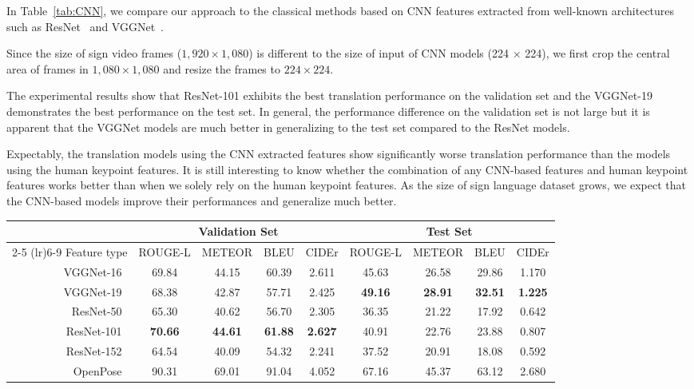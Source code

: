 \documentclass[10pt,twocolumn,letterpaper]{article}
\begin{document}
In Table~\ref{tab:CNN}, we compare our approach to the classical methods 
based on CNN features extracted from well-known architectures such as 
ResNet~\cite{HeZRS16} and VGGNet~\cite{SimonyanZ14a}.

Since the size of sign video frames ($1,920 \times 1,080$) is different to the size of input of CNN models (224 $\times$ 224), we first crop the central area of frames in $1,080 \times 1,080$ and resize the frames to $224 \times 224$.

The experimental results show that ResNet-101 exhibits the best translation performance on the validation set and the VGGNet-19 demonstrates the best performance on the test set. In general, the performance difference on the validation set is not large but it is apparent that the VGGNet models are much better in generalizing to the test set compared to the ResNet models. 

Expectably, the translation models using the CNN extracted features show significantly worse translation performance than the models using the human keypoint features. It is still interesting to know whether the combination of any CNN-based features and human keypoint features works better than when we solely rely on the human keypoint features. As the size of sign language dataset grows, we expect that the CNN-based models improve their performances and generalize much better.
\\

\begin{table*}[ht]
\centering
\begin{tabular}{@{ }rcccccccc@{ }}
\toprule
& \multicolumn{4}{c}{Validation Set} & \multicolumn{4}{c}{Test Set} \\
\cmidrule(lr){2-5} \cmidrule(lr){6-9}
Feature type    &   ROUGE-L & METEOR  & BLEU  & CIDEr &  ROUGE-L & METEOR  & BLEU & CIDEr\\
\midrule
VGGNet-16~\cite{SimonyanZ14a}  &  69.84 & 44.15 & 60.39 & 2.611 & 45.63 & 26.58 & 29.86 & 1.170\\
VGGNet-19~\cite{SimonyanZ14a}  &  68.38 & 42.87 & 57.71 & 2.425 & {\bf 49.16} & {\bf 28.91} & {\bf 32.51} & {\bf 1.225}\\ 
ResNet-50~\cite{HeZRS16}  & 65.30 & 40.62 & 56.70 & 2.305 & 36.35 & 21.22 & 17.92 & 0.642\\ 
ResNet-101~\cite{HeZRS16} & {\bf 70.66} & {\bf 44.61} & {\bf 61.88} & {\bf 2.627} & 40.91 & 22.76 & 23.88 & 0.807\\
ResNet-152~\cite{HeZRS16} & 64.54 & 40.09 & 54.32 & 2.241 & 37.52 & 20.91 & 18.08 & 0.592\\
\midrule
OpenPose~\cite{CaoSWS17,SimonJMS17,WeiRKS16} & 90.31 & 69.01 & 91.04 & 4.052 & 67.16 & 45.37 & 63.12 & 2.680\\  
\bottomrule
\end{tabular}
\caption{Performance comparison with translation models based on CNN-based feature extraction techniques. Note that the augmentation factor in this experiment is all set to 50.}
\label{tab:CNN}
\end{table*}
\end{document}
